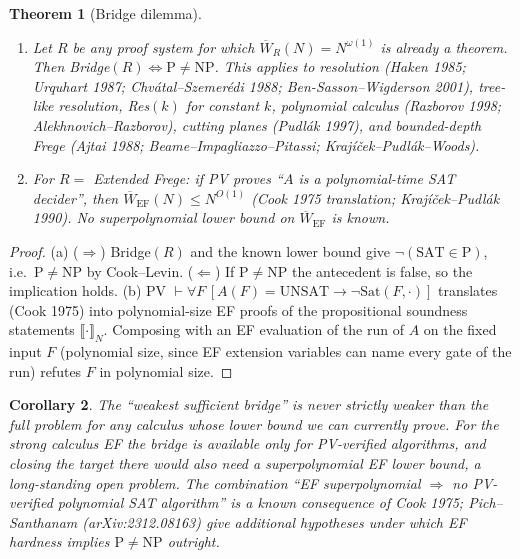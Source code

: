 \documentclass[11pt]{article}
\newtheorem{theorem}{Theorem}
\newtheorem{corollary}[theorem]{Corollary}
\theoremstyle{definition}
\theoremstyle{remark}
\newcommand{\WR}[1]{\overline{W}_{#1}}
\begin{document}
\begin{theorem}[Bridge dilemma]\label{t:dilemma}
\begin{enumerate}
\item[(a)] Let $R$ be any proof system for which $\WR{R}(N)=N^{\omega(1)}$ is already a theorem. Then Bridge$(R)\iff\mathrm{P}\ne\mathrm{NP}$.
This applies to resolution (Haken 1985; Urquhart 1987; Chvátal--Szemerédi 1988; Ben-Sasson--Wigderson 2001), tree-like resolution, Res$(k)$ for constant $k$,
polynomial calculus (Razborov 1998; Alekhnovich--Razborov), cutting planes (Pudlák 1997), and bounded-depth Frege (Ajtai 1988; Beame--Impagliazzo--Pitassi; Krajíček--Pudlák--Woods).
\item[(b)] For $R=$ Extended Frege: if PV proves ``$A$ is a polynomial-time SAT decider'', then $\WR{\mathrm{EF}}(N)\le N^{O(1)}$ (Cook 1975 translation; Krajíček--Pudlák 1990).
No superpolynomial lower bound on $\WR{\mathrm{EF}}$ is known.
\end{enumerate}
\end{theorem}
\begin{proof}
(a) ($\Rightarrow$) Bridge$(R)$ and the known lower bound give $\neg(\mathrm{SAT}\in\mathrm{P})$, i.e.\ $\mathrm{P}\ne\mathrm{NP}$ by Cook--Levin.
($\Leftarrow$) If $\mathrm{P}\ne\mathrm{NP}$ the antecedent is false, so the implication holds.
(b) PV $\vdash\forall F\,[A(F)=\mathrm{UNSAT}\to\neg\mathrm{Sat}(F,\cdot)]$ translates (Cook 1975) into polynomial-size EF proofs of the propositional
soundness statements $\llbracket\cdot\rrbracket_N$. Composing with an EF evaluation of the run of $A$ on the fixed input $F$ (polynomial size, since EF extension
variables can name every gate of the run) refutes $F$ in polynomial size.
\end{proof}

\begin{corollary}
The ``weakest sufficient bridge'' is never strictly weaker than the full problem for any calculus whose lower bound we can currently prove.
For the strong calculus EF the bridge is available only for PV-verified algorithms, and closing the target there would also need a superpolynomial EF lower bound,
a long-standing open problem. The combination ``EF superpolynomial $\Rightarrow$ no PV-verified polynomial SAT algorithm'' is a known consequence of Cook 1975;
Pich--Santhanam (arXiv:2312.08163) give additional hypotheses under which EF hardness implies $\mathrm{P}\ne\mathrm{NP}$ outright.
\end{corollary}
\end{document}
